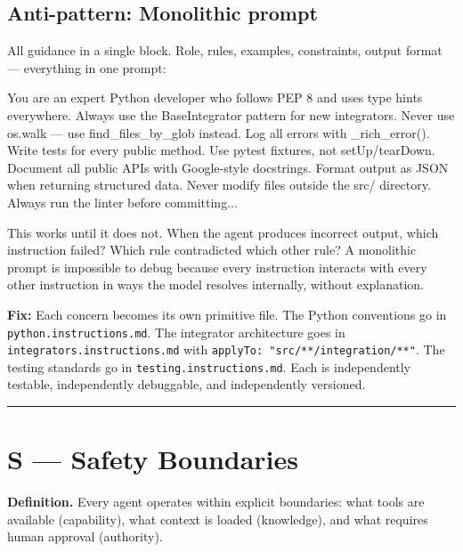 \documentclass[
  a4paper,
  DIV=11,
  numbers=noendperiod]{scrreprt}
\newenvironment{Shaded}{\begin{snugshade}}{\end{snugshade}}
\newcommand{\NormalTok}[1]{\textcolor[rgb]{0.00,0.23,0.31}{#1}}
\begin{document}
\subsection{Anti-pattern: Monolithic
prompt}\label{anti-pattern-monolithic-prompt}

All guidance in a single block. Role, rules, examples, constraints,
output format --- everything in one prompt:

\begin{Shaded}
\begin{Highlighting}[]
\NormalTok{You are an expert Python developer who follows PEP 8 and uses type hints}
\NormalTok{everywhere. Always use the BaseIntegrator pattern for new integrators.}
\NormalTok{Never use os.walk — use find\_files\_by\_glob instead. Log all errors with}
\NormalTok{\_rich\_error(). Write tests for every public method. Use pytest fixtures,}
\NormalTok{not setUp/tearDown. Document all public APIs with Google{-}style docstrings.}
\NormalTok{Format output as JSON when returning structured data. Never modify files}
\NormalTok{outside the src/ directory. Always run the linter before committing...}
\end{Highlighting}
\end{Shaded}

This works until it does not. When the agent produces incorrect output,
which instruction failed? Which rule contradicted which other rule? A
monolithic prompt is impossible to debug because every instruction
interacts with every other instruction in ways the model resolves
internally, without explanation.

\textbf{Fix:} Each concern becomes its own primitive file. The Python
conventions go in \texttt{python.instructions.md}. The integrator
architecture goes in \texttt{integrators.instructions.md} with
\texttt{applyTo:\ "src/**/integration/**"}. The testing standards go in
\texttt{testing.instructions.md}. Each is independently testable,
independently debuggable, and independently versioned.

\begin{center}\rule{0.5\linewidth}{0.5pt}\end{center}

\section{S --- Safety Boundaries}\label{s-safety-boundaries}

\textbf{Definition.} Every agent operates within explicit boundaries:
what tools are available (capability), what context is loaded
(knowledge), and what requires human approval (authority).
\end{document}
